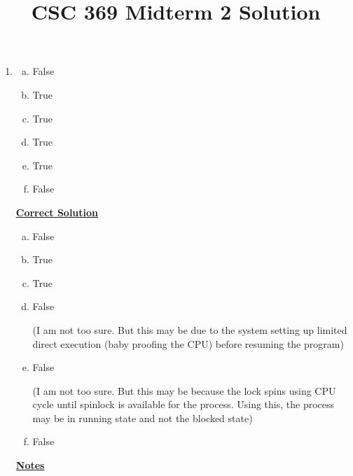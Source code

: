 \documentclass[12pt]{article}
\begin{document}
\title{CSC 369 Midterm 2 Solution}

\bigskip

\begin{enumerate}[1.]
    \item

    \begin{enumerate}[a)]
        \item False
        \item True
        \item True
        \item True
        \item True
        \item False
    \end{enumerate}

    \bigskip

    \begin{mdframed}
    \underline{\textbf{Correct Solution}}

    \bigskip

    \begin{enumerate}[a)]
        \item False
        \item True
        \item True
        \item \color{red}False\color{black}

        \bigskip

        \color{red}(I am not too sure. But this may be due to the system setting up
        limited direct execution (baby proofing the CPU) before resuming the program)\color{black}

        \bigskip
        \item \color{red}False\color{black}

        \bigskip

        \color{red}(I am not too sure. But this may be because the lock spins using CPU
        cycle until spinlock is available for the process. Using this,
        the process may be in running state and not the blocked state)\color{black}

        \bigskip

        \item False
    \end{enumerate}
    \end{mdframed}

    \bigskip

    \underline{\textbf{Notes}}

    \bigskip


\end{enumerate}
\end{document}
